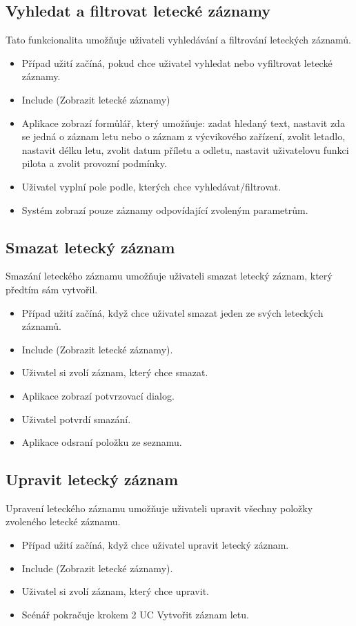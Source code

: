 \subsection{Vyhledat a filtrovat letecké záznamy}
Tato funkcionalita umožňuje uživateli vyhledávání a filtrování leteckých záznamů.

\begin{itemize}
\item Případ užití začíná, pokud chce uživatel vyhledat nebo vyfiltrovat letecké záznamy.
\item Include (Zobrazit letecké záznamy)
\item Aplikace zobrazí formůlář, který umožňuje: zadat hledaný text, nastavit zda se jedná o záznam letu nebo o záznam z výcvikového zařízení, zvolit letadlo, nastavit délku letu, zvolit datum příletu a odletu, nastavit uživatelovu funkci pilota a zvolit provozní podmínky.
\item Uživatel vyplní pole podle, kterých chce vyhledávat/filtrovat.
\item Systém zobrazí pouze záznamy odpovídající zvoleným parametrům.
\end{itemize}

\subsection{Smazat letecký záznam}
Smazání leteckého záznamu umožňuje uživateli smazat letecký záznam, který předtím sám vytvořil.

\begin{itemize}
\item Případ užití začíná, když chce uživatel smazat jeden ze svých leteckých záznamů.
\item Include (Zobrazit letecké záznamy).
\item Uživatel si zvolí záznam, který chce smazat.
\item Aplikace zobrazí potvrzovací dialog.
\item Uživatel potvrdí smazání.
\item Aplikace odsraní položku ze seznamu.
\end{itemize}


\subsection{Upravit letecký záznam}
Upravení leteckého záznamu umožňuje uživateli upravit všechny položky zvoleného letecké záznamu.

\begin{itemize}
\item Případ užití začíná, když chce uživatel upravit letecký záznam.
\item Include (Zobrazit letecké záznamy).
\item Uživatel si zvolí záznam, který chce upravit.
\item Scénář pokračuje krokem 2 UC Vytvořit záznam letu.
\end{itemize}

